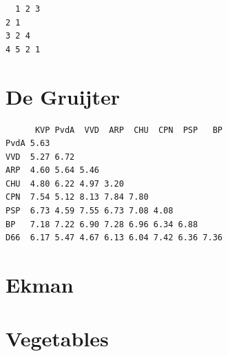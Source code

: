 \documentclass[
  12pt,
  letterpaper,
  DIV=11,
  numbers=noendperiod]{scrreprt}
\theoremstyle{remark}
\begin{document}

\begin{verbatim}
  1 2 3
2 1    
3 2 4  
4 5 2 1
\end{verbatim}

\section*{De Gruijter}\label{apdatagruijter}


\begin{verbatim}
      KVP PvdA  VVD  ARP  CHU  CPN  PSP   BP
PvdA 5.63                                   
VVD  5.27 6.72                              
ARP  4.60 5.64 5.46                         
CHU  4.80 6.22 4.97 3.20                    
CPN  7.54 5.12 8.13 7.84 7.80               
PSP  6.73 4.59 7.55 6.73 7.08 4.08          
BP   7.18 7.22 6.90 7.28 6.96 6.34 6.88     
D66  6.17 5.47 4.67 6.13 6.04 7.42 6.36 7.36
\end{verbatim}

\section*{Ekman}\label{apdataekman}


\section*{Vegetables}\label{apdataveg}

\end{document}

